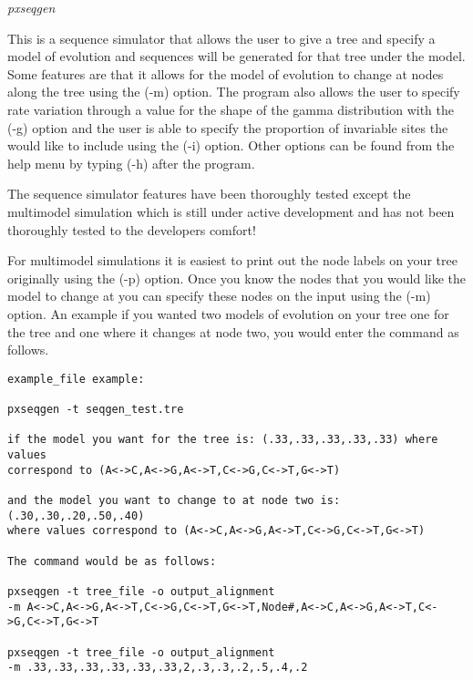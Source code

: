 \documentclass[12pt,letterpaper]{article}
\renewcommand{\subsection}[1]{%
\bigskip
\begin{center}
\begin{large}
\normalfont\itshape #1
\end{large}
\end{center}}
\begin{document}
\subsection{pxseqgen}

This is a sequence simulator that allows the user to give a tree and specify a model of evolution and sequences will be generated for that tree under the model. Some features are that it allows for the model of evolution to change at nodes along the tree using the (-m) option. The program also allows the user to specify rate variation through a value for the shape of the gamma distribution with the (-g) option and the user is able to specify the proportion of invariable sites the would like to include using the (-i) option. Other options can be found from the help menu by typing (-h) after the program.

The sequence simulator features have been thoroughly tested except the multimodel simulation which is still under active development and has not been thoroughly tested to the developers comfort!

For multimodel simulations it is easiest to print out the node labels on your tree originally using the (-p) option. Once you know the nodes that you would like the model to change at you can specify these nodes on the input using the (-m) option. An example if you wanted two models of evolution on your tree one for the tree and one where it changes at node two, you would enter the command as follows.


\begin{flushleft}
\begin{verbatim}
example_file example:

pxseqgen -t seqgen_test.tre

if the model you want for the tree is: (.33,.33,.33,.33,.33) where values 
correspond to (A<->C,A<->G,A<->T,C<->G,C<->T,G<->T)

and the model you want to change to at node two is: (.30,.30,.20,.50,.40)
where values correspond to (A<->C,A<->G,A<->T,C<->G,C<->T,G<->T)

The command would be as follows: 

pxseqgen -t tree_file -o output_alignment 
-m A<->C,A<->G,A<->T,C<->G,C<->T,G<->T,Node#,A<->C,A<->G,A<->T,C<->G,C<->T,G<->T

pxseqgen -t tree_file -o output_alignment 
-m .33,.33,.33,.33,.33,.33,2,.3,.3,.2,.5,.4,.2
\end{verbatim}
\end{flushleft}
\end{document}
